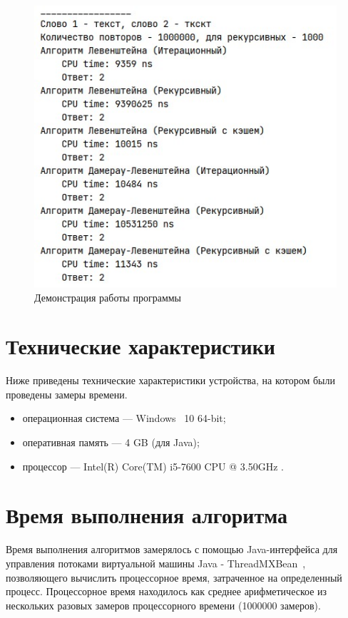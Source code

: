 \documentclass[12pt]{report}
\begin{document}
    \begin{figure}[H]
        \centering
        \includegraphics[scale=1]{img/workSample}
        \caption{Демонстрация работы программы}
        \label{fig:workSample}
    \end{figure}


    \section{Технические характеристики}
    Ниже приведены технические характеристики устройства, на котором были проведены замеры времени.
    \begin{itemize}
        \item операционная система --- Windows~\cite{windows} 10 64-bit;
        \item оперативная память --- 4 GB (для Java);
        \item процессор --- Intel(R) Core(TM) i5-7600 CPU @ 3.50GHz \cite{i5}.
    \end{itemize}


    \section{Время выполнения алгоритма}
    Время выполнения алгоритмов замерялось с помощью Java-интерфейса для управления потоками
    виртуальной машины Java - ThreadMXBean~\cite{threadMXBean}, позволяющего вычислить процессорное время,
    затраченное на определенный процесс.
    Процессорное время находилось как среднее арифметическое
    из нескольких разовых замеров процессорного времени (1000000 замеров).
\end{document}
